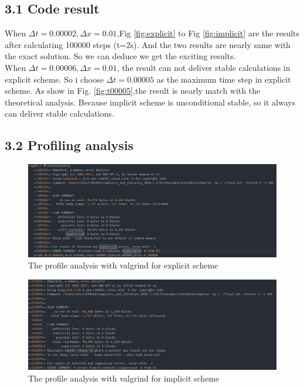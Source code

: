 \documentclass[12pt]{article}
\begin{document}
\subsection*{3.1 Code result}
When $\Delta t=0.00002,\Delta x= 0.01$,Fig \ref{fig:explicit} to Fig \ref{fig:implicit} are the results after calculating 100000 steps (t=2s). And the two results are nearly same with the exact solution. So we can deduce we get the exciting results.\\
When $\Delta t=0.00006,\Delta x= 0.01$, the result can not deliver stable calculations in explicit scheme. So i choose $\Delta t=0.00005$ as the maximum time step in explicit scheme. As show in Fig. \ref{fig:t00005},the result is nearly match with the theoretical analysis. Because implicit scheme is unconditional stable, so it always can deliver stable calculations.

\subsection*{3.2 Profiling analysis}
\begin{figure}
    \centering
    \includegraphics[scale=0.5]{img/profileexp.png}
    \caption{The profile analysis with valgrind for explicit scheme}
    \label{fig:profileexp}
\end{figure}

\begin{figure}
    \centering
    \includegraphics[scale=0.5]{img/profileimp.png}
    \caption{The profile analysis with valgrind for implicit scheme}
    \label{fig:profileimp}
\end{figure}
\end{document}
